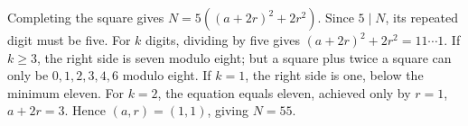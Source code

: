 Completing the square gives $N=5((a+2r)^2+2r^2)$. Since $5\mid N$, its repeated digit must be five. For $k$ digits, dividing by five gives $(a+2r)^2+2r^2=11\cdots1$. If $k\ge3$, the right side is seven modulo eight; but a square plus twice a square can only be $0,1,2,3,4,6$ modulo eight. If $k=1$, the right side is one, below the minimum eleven. For $k=2$, the equation equals eleven, achieved only by $r=1$, $a+2r=3$. Hence $\boxed{(a,r)=(1,1)}$, giving $N=55$.
